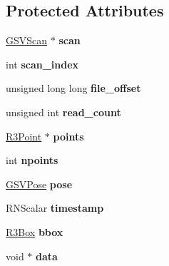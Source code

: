 \subsection*{Protected Attributes}
\begin{DoxyCompactItemize}
\item 
\hyperlink{class_g_s_v_scan}{G\+S\+V\+Scan} $\ast$ {\bfseries scan}\hypertarget{class_g_s_v_scanline_a7b714c4d1682b6d91df0d1785a4d3a97}{}\label{class_g_s_v_scanline_a7b714c4d1682b6d91df0d1785a4d3a97}

\item 
int {\bfseries scan\+\_\+index}\hypertarget{class_g_s_v_scanline_a05bafae2560724be75ac12b1129c752c}{}\label{class_g_s_v_scanline_a05bafae2560724be75ac12b1129c752c}

\item 
unsigned long long {\bfseries file\+\_\+offset}\hypertarget{class_g_s_v_scanline_ae08de3f717bf6e97722affe5257cae27}{}\label{class_g_s_v_scanline_ae08de3f717bf6e97722affe5257cae27}

\item 
unsigned int {\bfseries read\+\_\+count}\hypertarget{class_g_s_v_scanline_ad8c6d5f8ecf459fd2956cb2541cbf7a5}{}\label{class_g_s_v_scanline_ad8c6d5f8ecf459fd2956cb2541cbf7a5}

\item 
\hyperlink{class_r3_point}{R3\+Point} $\ast$ {\bfseries points}\hypertarget{class_g_s_v_scanline_aaf78b6d777a841b8b6566fe4c1f57b43}{}\label{class_g_s_v_scanline_aaf78b6d777a841b8b6566fe4c1f57b43}

\item 
int {\bfseries npoints}\hypertarget{class_g_s_v_scanline_a97eab0b2d2d54efe149d8493dfecb528}{}\label{class_g_s_v_scanline_a97eab0b2d2d54efe149d8493dfecb528}

\item 
\hyperlink{class_g_s_v_pose}{G\+S\+V\+Pose} {\bfseries pose}\hypertarget{class_g_s_v_scanline_af80a65cf5d10b5eed00e3940151bb103}{}\label{class_g_s_v_scanline_af80a65cf5d10b5eed00e3940151bb103}

\item 
R\+N\+Scalar {\bfseries timestamp}\hypertarget{class_g_s_v_scanline_aaad33125e53c0b00fb4da5bbb85af398}{}\label{class_g_s_v_scanline_aaad33125e53c0b00fb4da5bbb85af398}

\item 
\hyperlink{class_r3_box}{R3\+Box} {\bfseries bbox}\hypertarget{class_g_s_v_scanline_a6759b95f8039bdcf1d937b9c979f5721}{}\label{class_g_s_v_scanline_a6759b95f8039bdcf1d937b9c979f5721}

\item 
void $\ast$ {\bfseries data}\hypertarget{class_g_s_v_scanline_a2f307e512fb11c03d3309476ab189119}{}\label{class_g_s_v_scanline_a2f307e512fb11c03d3309476ab189119}

\end{DoxyCompactItemize}
